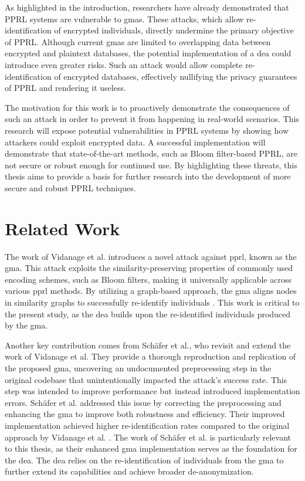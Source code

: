 As highlighted in the introduction, researchers have already demonstrated that PPRL systems are vulnerable to \ac{gma}s. These attacks, which allow re-identification of encrypted individuals, directly undermine the primary objective of PPRL. Although current \ac{gma}s are limited to overlapping data between encrypted and plaintext databases, the potential implementation of a \ac{dea} could introduce even greater risks. Such an attack would allow complete re-identification of encrypted databases, effectively nullifying the privacy guarantees of PPRL and rendering it useless.

The motivation for this work is to proactively demonstrate the consequences of such an attack in order to prevent it from happening in real-world scenarios. This research will expose potential vulnerabilities in PPRL systems by showing how attackers could exploit encrypted data. A successful implementation will demonstrate that state-of-the-art methods, such as Bloom filter-based PPRL, are not secure or robust enough for continued use. By highlighting these threats, this thesis aims to provide a basis for further research into the development of more secure and robust PPRL techniques.


\section{Related Work}  \label{sec:rel-work}

The work of Vidanage et al. introduces a novel attack against \ac{pprl}, known as the \ac{gma}. This attack exploits the similarity-preserving properties of commonly used encoding schemes, such as Bloom filters, making it universally applicable across various \ac{pprl} methods. By utilizing a graph-based approach, the \ac{gma} aligns nodes in similarity graphs to successfully re-identify individuals \cite{pathak2024}. This work is critical to the present study, as the \ac{dea} builds upon the re-identified individuals produced by the \ac{gma}.

Another key contribution comes from Schäfer et al., who revisit and extend the work of Vidanage et al. They provide a thorough reproduction and replication of the proposed \ac{gma}, uncovering an undocumented preprocessing step in the original codebase that unintentionally impacted the attack's success rate. This step was intended to improve performance but instead introduced implementation errors. Schäfer et al. addressed this issue by correcting the preprocessing and enhancing the \ac{gma} to improve both robustness and efficiency. Their improved implementation achieved higher re-identification rates compared to the original approach by Vidanage et al. \cite{schaefer2024}. The work of Schäfer et al. is particularly relevant to this thesis, as their enhanced \ac{gma} implementation serves as the foundation for the \ac{dea}. The \ac{dea} relies on the re-identification of individuals from the \ac{gma} to further extend its capabilities and achieve broader de-anonymization.


